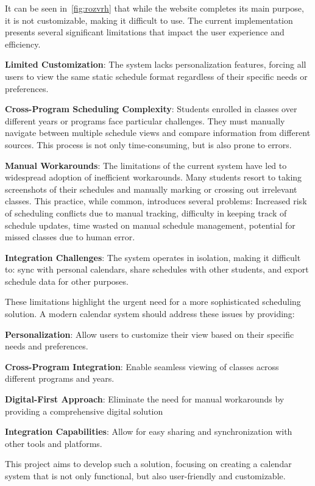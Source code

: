 It can be seen in~\ref{fig:rozvrh} that while the website completes its main purpose, it is not customizable, making it difficult to use.
The current implementation presents several significant limitations that impact the user experience and efficiency.

\textbf{Limited Customization}: The system lacks personalization features, forcing all users to view the same static schedule format regardless of their specific needs or preferences.

\textbf{Cross-Program Scheduling Complexity}: Students enrolled in classes over different years or programs face particular challenges.
They must manually navigate between multiple schedule views and compare information from different sources.
This process is not only time-consuming, but is also prone to errors.

\textbf{Manual Workarounds}: The limitations of the current system have led to widespread adoption of inefficient workarounds.
Many students resort to taking screenshots of their schedules and manually marking or crossing out irrelevant classes.
This practice, while common, introduces several problems:
Increased risk of scheduling conflicts due to manual tracking,
difficulty in keeping track of schedule updates,
time wasted on manual schedule management,
potential for missed classes due to human error.


\textbf{Integration Challenges}: The system operates in isolation, making it difficult to:
sync with personal calendars,
share schedules with other students, and
export schedule data for other purposes.


These limitations highlight the urgent need for a more sophisticated scheduling solution.
A modern calendar system should address these issues by providing:

\textbf{Personalization}: Allow users to customize their view based on their specific needs and preferences.

\textbf{Cross-Program Integration}: Enable seamless viewing of classes across different programs and years.

\textbf{Digital-First Approach}: Eliminate the need for manual workarounds by providing a comprehensive digital solution

\textbf{Integration Capabilities}: Allow for easy sharing and synchronization with other tools and platforms.


This project aims to develop such a solution, focusing on creating a calendar system that is not only functional, but also user-friendly and customizable.


